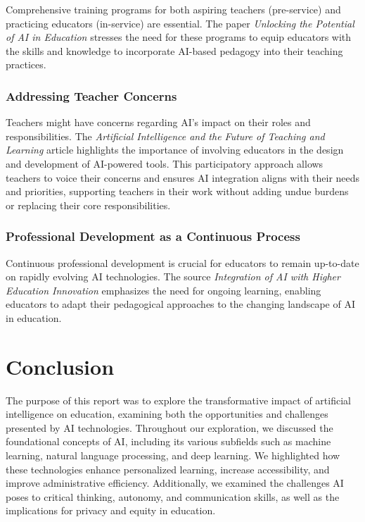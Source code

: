 \documentclass{article}
\begin{document}
Comprehensive training programs for both aspiring teachers (pre-service)
and practicing educators (in-service) are essential. The paper
\textit{Unlocking the Potential of AI in Education} \cite{Rashmi2023Unlocking}
stresses the need for these programs to equip educators with the skills and knowledge
to incorporate AI-based pedagogy into their teaching practices.

\subsubsection{Addressing Teacher Concerns}

Teachers might have concerns regarding AI's impact on their roles and responsibilities.
The \textit{Artificial Intelligence and the Future of Teaching and Learning}
article highlights the importance of involving educators in the design and development
of AI-powered tools. This participatory approach allows teachers to voice their
concerns and ensures AI integration aligns with their needs and priorities,
supporting teachers in their work without adding undue burdens or replacing their core
responsibilities.

\subsubsection{Professional Development as a Continuous Process}

Continuous professional development is crucial for educators to remain up-to-date
on rapidly evolving AI technologies. The source \textit{Integration of AI with Higher Education Innovation}
\cite{Shi2023IntegrationOA} emphasizes the need for ongoing learning, enabling
educators to adapt their pedagogical approaches to the changing landscape of AI in education.



\newpage

\section{Conclusion}
The purpose of this report was to explore the transformative impact of
artificial intelligence on education, examining both the opportunities
and challenges presented by AI technologies. Throughout our exploration,
we discussed the foundational concepts of AI, including its various
subfields such as machine learning, natural language processing, and
deep learning. We highlighted how these technologies enhance personalized
learning, increase accessibility, and improve administrative efficiency.
Additionally, we examined the challenges AI poses to critical thinking,
autonomy, and communication skills, as well as the implications for privacy
and equity in education.
\end{document}
